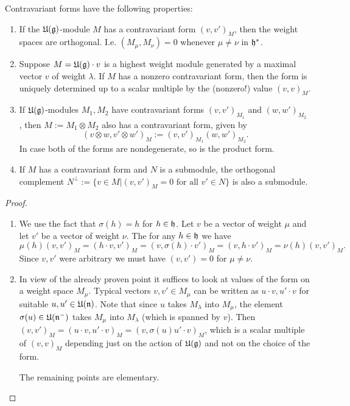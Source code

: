 \begin{proposition}
Contravariant forms have the following properties:
\begin{enumerate}
 \item If the $\mathfrak{U(g)}$-module $M$ has a contravariant form $(v,v')_M$, then the weight spaces are orthogonal. I.e. $( M_\mu,M_\nu)=0$ whenever $\mu\neq\nu$ in $\mathfrak{h}^*$.
 \item Suppose $M = \mathfrak{U(g)} \cdot v$ is a highest weight module generated by a maximal vector $v$ of weight $\lambda$. If $M$ has a nonzero contravariant form, then the form is uniquely determined up to a scalar multiple by the (nonzero!) value $( v, v)_M$.
 \item  If $\mathfrak{U(g)}$-modules $M_1, M_2$ have contravariant forms $(v, v')_{M_1}$ and $(w,w')_{M_2}$ , then $M := M_1\otimes M_2$ also has a contravariant form, given by \[(v\otimes w, v'\otimes w')_M := (v, v')_{M_1} (w,w')_{M_2}.\] In case both of the forms are nondegenerate, so is the product form.
 \item If $M$ has a contravariant form and $N$ is a submodule, the orthogonal complement $N^\perp := \{v\in M | (v, v')_M = 0 \text{ for all } v' \in N \}$ is also a submodule.
\end{enumerate}
\end{proposition}
\begin{proof}
\begin{enumerate}
 \item We use the fact that $\sigma(h) = h$ for $h\in\mathfrak{h}$. Let $v$ be a vector of weight $\mu$ and let $v'$ be a vector of weight $\nu$. The for any $h\in\mathfrak{h}$ we have
 \[
  \mu(h)(v,v')_M = (h\cdot v,v')_M = (v,\sigma(h)\cdot v')_M = (v,h\cdot v')_M = \nu(h)(v,v')_M.
 \]
 Since $v,v'$ were arbitrary we must have $(v,v')=0$ for $\mu\neq \nu$.
 \item In view of the already proven point it suffices to look at values of the form on a weight
space $M_\mu$. Typical vectors $v, v' \in M_\mu$ can be written as $u\cdot v, u'\cdot v$ for suitable $u, u'\in\mathfrak{U(n)}$. Note that since $u$ takes $M_\lambda$ into $M_\mu$, the element $\sigma(u) \in \mathfrak{U(n^-)}$ takes $M_\mu$ into $M_\lambda$ (which is spanned by $v$). Then $(v, v')_M = (u\cdot v, u'\cdot v)_M = (v, \sigma(u)u'\cdot v)_M$, which is a scalar multiple of $(v, v)_M$ depending just on the action of $\mathfrak{U(g)}$ and not on the choice of the form.

The remaining points are elementary.
\end{enumerate}
\end{proof}

